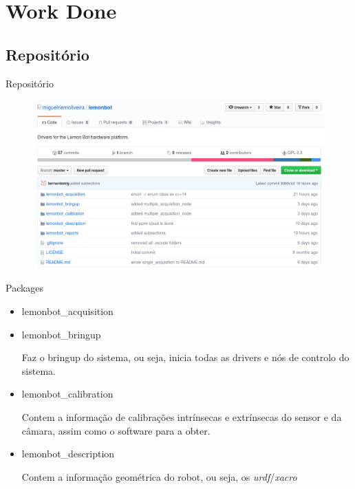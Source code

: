 \section{Work Done}

\subsection{Repositório}

\begin{frame}{Repositório}
															
	\begin{figure}
		\includegraphics[width=\textwidth]{img/repo.png}						
	\end{figure}
															    
\end{frame}

\begin{frame}{Packages}
			
	\begin{itemize}
		\item lemonbot\_acquisition	      
			
		\item lemonbot\_bringup	      
			
			 {
		      	Faz o bringup do sistema, ou seja, inicia todas as drivers e nós de controlo do sistema.
		      }
		\item lemonbot\_calibration
			
			\only<3> {
		      	Contem a informação de calibrações intrínsecas e extrínsecas do sensor e da câmara, assim como o software para a obter.
		      }	      
		\item lemonbot\_description
			
			\only<4> {
		      	Contem a informação geométrica do robot, ou seja, os \textit{urdf}/\textit{xacro} 
		      }	      
	\end{itemize}
															
\end{frame}

